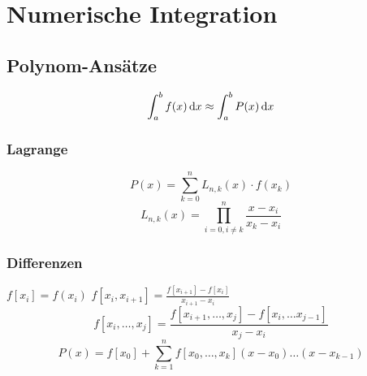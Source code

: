 \documentclass[german]{latex4ei/latex4ei_sheet}
\begin{document}
\section{Numerische Integration}
\begin{sectionbox}
\subsection{Polynom-Ansätze}
\begin{equation*}
	\int_a^b f(x) \diff x \approx \int_a^b P(x) \diff x
\end{equation*}

\subsubsection{Lagrange}
\begin{equation*}
	P(x) = \sum_{k = 0}^n L_{n, k}(x)\cdot f(x_k)
\end{equation*}
\begin{equation*}
	L_{n, k}(x) = \prod_{i = 0, i \ne k}^n \frac{x - x_i}{x_k - x_i}
\end{equation*}

\subsubsection{Differenzen}
$f[x_i] = f(x_i)$ \qquad $f[x_i, x_{i+1}] = \frac{f[x_{i + 1}] - f[x_i]}{x_{i+1} - x_i}$
\begin{equation*}
	f[x_i, \dots, x_j] = \frac{f[x_{i + 1}, \dots, x_j] - f[x_i, \dots x_{j - 1}]}{x_j - x_i}
\end{equation*}
\begin{equation*}
	P(x) = f[x_0] + \sum_{k = 1}^n f[x_0, \dots, x_k] (x - x_0) \dots (x - x_{k - 1})
\end{equation*}
\end{sectionbox}
\end{document}
